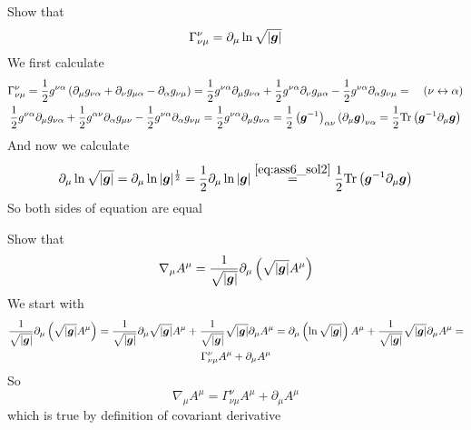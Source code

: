 \problem

Show that 
%
\begin{equation}
    \Gamma_{\nu\mu}^\nu = \partial_\mu \ln \sqrt{|\boldsymbol{g}|}
\end{equation}
%
We first calculate
%
\begin{multline}
    \Gamma_{\nu\mu}^\nu = \frac{1}{2}g^{\nu\alpha}\left(
        \partial_\mu g_{\nu\alpha} +
        \partial_\nu g_{\mu\alpha} - 
        \partial_\alpha g_{\nu\mu}
    \right)=
    \frac{1}{2}g^{\nu\alpha}\partial_\mu g_{\nu\alpha} +
    \frac{1}{2}g^{\nu\alpha}\partial_\nu g_{\mu\alpha} - 
    \frac{1}{2}g^{\nu\alpha}\partial_\alpha g_{\nu\mu} = \quad (\nu \leftrightarrow \alpha) \\
    \frac{1}{2}g^{\nu\alpha}\partial_\mu g_{\nu\alpha} +
    \frac{1}{2}g^{\alpha\nu}\partial_\alpha g_{\mu\nu} - 
    \frac{1}{2}g^{\nu\alpha}\partial_\alpha g_{\nu\mu} =
    \frac{1}{2}g^{\nu\alpha}\partial_\mu g_{\nu\alpha} =
    \frac{1}{2}\left(\boldsymbol{g}^{-1}\right)_{\alpha\nu}\left(\partial_\mu \boldsymbol{g}\right)_{\nu\alpha} =
    \frac{1}{2}\text{Tr}\left(\boldsymbol{g}^{-1}\partial_\mu\boldsymbol{g}\right)
\end{multline}
%
And now we calculate 
%
\begin{equation}
    \partial_\mu \ln \sqrt{|\bs{g}|} = 
    \partial_\mu \ln |\bs{g}|^{\frac{1}{2}} = 
    \frac{1}{2} \partial_\mu \ln |\bs{g}| \stackrel{\cref{eq:ass6_sol2}}{=}  
    \frac{1}{2} \text{Tr}\left(\bs{g}^{-1}\partial_\mu \bs{g}\right)
\end{equation}
%
So both sides of equation are equal

\problem

Show that
%
\begin{equation}
    \nabla_\mu A^\mu = \frac{1}{\sqrt{|\boldsymbol{g}|}}\partial_\mu
    \left(\sqrt{|\boldsymbol{g}|}A^\mu\right) 
\end{equation}
%
We start with 
%
\begin{multline}
    \frac{1}{\sqrt{|\boldsymbol{g}|}}\partial_\mu
    \left(\sqrt{|\boldsymbol{g}|}A^\mu\right) = 
    \frac{1}{\sqrt{|\boldsymbol{g}|}}
    \partial_\mu\sqrt{|\boldsymbol{g}|}
    A^\mu +
    \frac{1}{\sqrt{|\boldsymbol{g}|}}
    \sqrt{|\boldsymbol{g}|}
    \partial_\mu A^\mu =
    \partial_\mu\left(\ln\sqrt{|\boldsymbol{g}|}\right)
    A^\mu +
    \frac{1}{\sqrt{|\boldsymbol{g}|}}
    \sqrt{|\boldsymbol{g}|}
    \partial_\mu A^\mu =\\
    \Gamma_{\nu\mu}^\nu A^\mu + 
    \partial_\mu A^\mu
\end{multline}
%
So 
%
\begin{equation}
    \nabla_\mu A^\mu =
    \Gamma_{\nu\mu}^\nu A^\mu + 
    \partial_\mu A^\mu
\end{equation}
%
which is true by definition of covariant derivative

